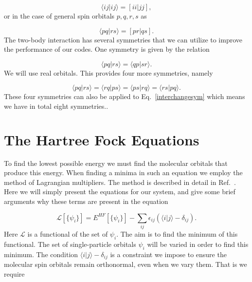 \documentclass[a4paper,norsk,11pt,twoside]{report}
\begin{document}
\begin{equation}
\langle ij | ij \rangle = [ii|jj] ,
\end{equation}
or in the case of general spin orbitals $p, q, r, s$ as

\begin{equation}
\langle pq | rs \rangle = [pr|qs] .
\end{equation}
The two-body interaction has several symmetries that we can utilize to improve the performance  of our codes.
One symmetry is given by the relation

\begin{equation}
\langle pq | rs \rangle = \langle qp | sr \rangle . \label{interchangesym} 
\end{equation}
We will use real orbitals. This provides four more symmetries, namely

\begin{equation}
\langle pq | rs \rangle = \langle rq | ps \rangle = \langle ps | rq \rangle = \langle rs | pq \rangle . \label{interchangesym2}
\end{equation}
These four symmetries can also be applied to Eq.~\eqref{interchangesym} which means we have in total eight symmetries..

\section{The Hartree Fock Equations}

To find the lowest possible energy we must find the molecular orbitals
that produce this energy. When finding a minima in such an equation we
employ the method of Lagrangian multipliers. The method is described
in detail in Ref.~\cite{lagrange_duden}. Here we will simply present the
equations for our system, and give some brief arguments  why these terms are
present in the equation

\begin{equation}
\mathcal{L}[\{\psi_i\}] = E^{HF}[\{\psi_i\}] - \sum_{ij} \epsilon_{ij} \left( \langle i | j \rangle - \delta_{ij} \right) . \label{tweakhf}
\end{equation}
Here $\mathcal{L}$ is a functional of the set of $\psi_i$. The aim is to find the minimum of this functional. 
The set of single-particle orbitals $\psi_i$ will be varied in order to find this minimum. The condition $\langle i | j \rangle - \delta_{ij}$ is a constraint we impose to ensure the molecular spin orbitals remain orthonormal, even when we vary them. That is we require
\end{document}
